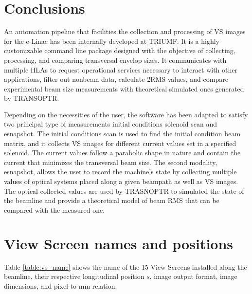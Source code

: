 \documentclass{article}
\begin{document}
\newpage
\section{Conclusions}

An automation pipeline that facilities the collection and processing of VS images for the e-Linac has been internally developed at TRIUMF. It is a highly customizable command line package designed with the objective of collecting, processing, and comparing transversal envelop sizes. It communicates with multiple HLAs to request operational services necessary to interact with other applications, filter out nonbeam data, calculate 2RMS values, and compare experimental beam size measurements with theoretical simulated ones generated by TRANSOPTR. 

Depending on the necessities of the user, the software has been adapted to satisfy two principal type of measurements initial conditions solenoid scan and esnapshot. The initial conditions scan is used to find the initial condition beam matrix, and it collects VS images for different current values set in a specified solenoid. The current values follow a parabolic shape in nature and contain the current that minimizes the transversal beam size. The second modality, esnapshot,  allows the user to record the machine's state by collecting multiple values of optical systems placed along a given beampath as well as VS images. The optical collected values are used by TRASNOPTR to simulated the state of the beamline and provide a theoretical model of beam RMS that can be compared with the measured one.    


\newpage




\newpage
\appendix
\section{View Screen names and positions} \label{appendix:VS_NAME_S}

Table \ref{table:vs_name} shows the name of the 15 View Screens installed along the beamline, their respective longitudinal position $s$, image output format, image dimensions, and pixel-to-mm relation.
\end{document}
